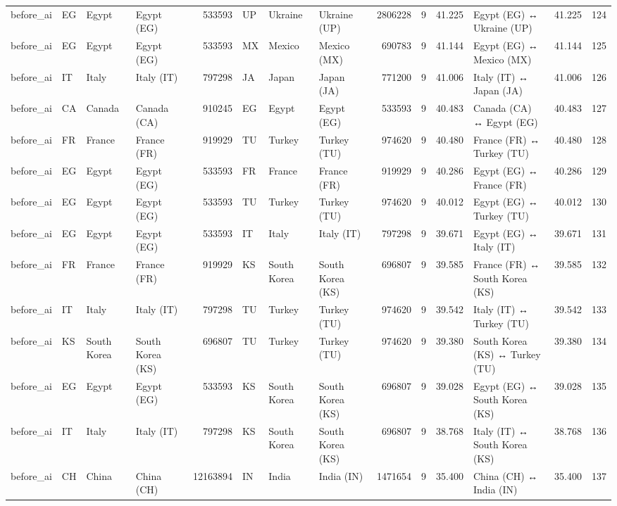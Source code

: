 \begin{tabular}{llllrlllrrrlrr}
before\_ai & EG & Egypt & Egypt (EG) & 533593 & UP & Ukraine & Ukraine (UP) & 2806228 & 9 & 41.225 & Egypt (EG) ↔ Ukraine (UP) & 41.225 & 124 \\
before\_ai & EG & Egypt & Egypt (EG) & 533593 & MX & Mexico & Mexico (MX) & 690783 & 9 & 41.144 & Egypt (EG) ↔ Mexico (MX) & 41.144 & 125 \\
before\_ai & IT & Italy & Italy (IT) & 797298 & JA & Japan & Japan (JA) & 771200 & 9 & 41.006 & Italy (IT) ↔ Japan (JA) & 41.006 & 126 \\
before\_ai & CA & Canada & Canada (CA) & 910245 & EG & Egypt & Egypt (EG) & 533593 & 9 & 40.483 & Canada (CA) ↔ Egypt (EG) & 40.483 & 127 \\
before\_ai & FR & France & France (FR) & 919929 & TU & Turkey & Turkey (TU) & 974620 & 9 & 40.480 & France (FR) ↔ Turkey (TU) & 40.480 & 128 \\
before\_ai & EG & Egypt & Egypt (EG) & 533593 & FR & France & France (FR) & 919929 & 9 & 40.286 & Egypt (EG) ↔ France (FR) & 40.286 & 129 \\
before\_ai & EG & Egypt & Egypt (EG) & 533593 & TU & Turkey & Turkey (TU) & 974620 & 9 & 40.012 & Egypt (EG) ↔ Turkey (TU) & 40.012 & 130 \\
before\_ai & EG & Egypt & Egypt (EG) & 533593 & IT & Italy & Italy (IT) & 797298 & 9 & 39.671 & Egypt (EG) ↔ Italy (IT) & 39.671 & 131 \\
before\_ai & FR & France & France (FR) & 919929 & KS & South Korea & South Korea (KS) & 696807 & 9 & 39.585 & France (FR) ↔ South Korea (KS) & 39.585 & 132 \\
before\_ai & IT & Italy & Italy (IT) & 797298 & TU & Turkey & Turkey (TU) & 974620 & 9 & 39.542 & Italy (IT) ↔ Turkey (TU) & 39.542 & 133 \\
before\_ai & KS & South Korea & South Korea (KS) & 696807 & TU & Turkey & Turkey (TU) & 974620 & 9 & 39.380 & South Korea (KS) ↔ Turkey (TU) & 39.380 & 134 \\
before\_ai & EG & Egypt & Egypt (EG) & 533593 & KS & South Korea & South Korea (KS) & 696807 & 9 & 39.028 & Egypt (EG) ↔ South Korea (KS) & 39.028 & 135 \\
before\_ai & IT & Italy & Italy (IT) & 797298 & KS & South Korea & South Korea (KS) & 696807 & 9 & 38.768 & Italy (IT) ↔ South Korea (KS) & 38.768 & 136 \\
before\_ai & CH & China & China (CH) & 12163894 & IN & India & India (IN) & 1471654 & 9 & 35.400 & China (CH) ↔ India (IN) & 35.400 & 137 \\

\end{tabular}
